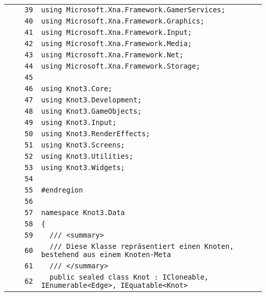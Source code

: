 \documentclass[a4paper,10pt]{article}
\begin{document}
\begin{longtable}[l]{lrrl}
\cellcolor{gray} &  & \verb~39~ & \verb~using Microsoft.Xna.Framework.GamerServices;~\\
\cellcolor{gray} &  & \verb~40~ & \verb~using Microsoft.Xna.Framework.Graphics;~\\
\cellcolor{gray} &  & \verb~41~ & \verb~using Microsoft.Xna.Framework.Input;~\\
\cellcolor{gray} &  & \verb~42~ & \verb~using Microsoft.Xna.Framework.Media;~\\
\cellcolor{gray} &  & \verb~43~ & \verb~using Microsoft.Xna.Framework.Net;~\\
\cellcolor{gray} &  & \verb~44~ & \verb~using Microsoft.Xna.Framework.Storage;~\\
\cellcolor{gray} &  & \verb~45~ & \verb~~\\
\cellcolor{gray} &  & \verb~46~ & \verb~using Knot3.Core;~\\
\cellcolor{gray} &  & \verb~47~ & \verb~using Knot3.Development;~\\
\cellcolor{gray} &  & \verb~48~ & \verb~using Knot3.GameObjects;~\\
\cellcolor{gray} &  & \verb~49~ & \verb~using Knot3.Input;~\\
\cellcolor{gray} &  & \verb~50~ & \verb~using Knot3.RenderEffects;~\\
\cellcolor{gray} &  & \verb~51~ & \verb~using Knot3.Screens;~\\
\cellcolor{gray} &  & \verb~52~ & \verb~using Knot3.Utilities;~\\
\cellcolor{gray} &  & \verb~53~ & \verb~using Knot3.Widgets;~\\
\cellcolor{gray} &  & \verb~54~ & \verb~~\\
\cellcolor{gray} &  & \verb~55~ & \verb~#endregion~\\
\cellcolor{gray} &  & \verb~56~ & \verb~~\\
\cellcolor{gray} &  & \verb~57~ & \verb~namespace Knot3.Data~\\
\cellcolor{gray} &  & \verb~58~ & \verb~{~\\
\cellcolor{gray} &  & \verb~59~ & \verb~  /// <summary>~\\
\cellcolor{gray} &  & \verb~60~ & \verb~  /// Diese Klasse repräsentiert einen Knoten, bestehend aus einem Knoten-Meta~\\
\cellcolor{gray} &  & \verb~61~ & \verb~  /// </summary>~\\
\cellcolor{gray} &  & \verb~62~ & \verb~  public sealed class Knot : ICloneable, IEnumerable<Edge>, IEquatable<Knot>~\\

\end{longtable}
\end{document}
